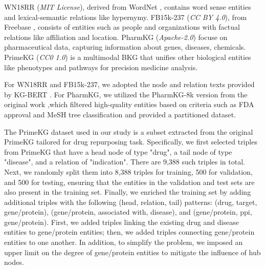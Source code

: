 \documentclass[11pt]{article}
\begin{document}
\begin{table}[h]
    \centering
    \caption{Statistics of the four datasets.}
    \label{tab:datasetstats}
\end{table}


 WN18RR (\textit{MIT License}), derived from WordNet \citep{miller1995wordnet}, contains word sense entities and lexical-semantic relations like hypernymy. FB15k-237 (\textit{CC BY 4.0}), from Freebase \citep{bollacker2008freebase}, consists of entities such as people and organizations with factual relations like affiliation and location. PharmKG (\textit{Apache-2.0}) focuse on pharmaceutical data, capturing information about genes, diseases, chemicals. PrimeKG (\textit{CC0 1.0}) is a multimodal BKG that unifies other biological entities like phenotypes and pathways for precision medicine analysis. 

For WN18RR and FB15k-237, we adopted the node and relation texts provided by KG-BERT \citep{yao2019kg}. For PharmKG, we utilized the PharmKG-8k version from the original work \citep{zheng2021pharmkg},which filtered high-quality entities based on criteria such as FDA approval and MeSH tree classification and provided a partitioned dataset. 

The PrimeKG dataset used in our study is a subset extracted from the original PrimeKG \citep{chandak2023building} tailored for drug repurposing task. Specifically, we first selected triples from PrimeKG that have a head node of type "drug", a tail node of type "disease", and a relation of "indication". There are 9,388 such triples in total. Next, we randomly split them into 8,388 triples for training, 500 for validation, and 500 for testing, ensuring that the entities in the validation and test sets are also present in the training set. Finally, we enriched the training set by adding additional triples with the following (head, relation, tail) patterns: (drug, target, gene/protein), (gene/protein, associated with, disease), and (gene/protein, ppi, gene/protein). First, we added triples linking the existing drug and disease entities to gene/protein entities; then, we added triples connecting gene/protein entities to one another. In addition, to simplify the problem, we imposed an upper limit on the degree of gene/protein entities to mitigate the influence of hub nodes.
\end{document}
